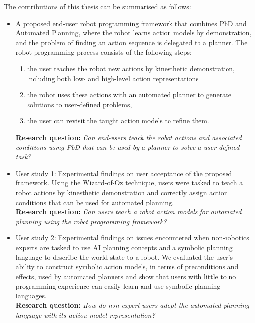 The contributions of this thesis can be summarised as follows:
\begin{itemize}
	\item {A proposed end-user robot programming framework that combines PbD and Automated Planning, where the robot learns action models by demonstration, and the problem of finding an action sequence is delegated to a planner. %
	The robot programming process consists of the following steps:
	\begin{enumerate}
		\item the user teaches the robot new actions by kinesthetic demonstration, including both low- and high-level action representations
		\item the robot uses these actions with an automated planner to generate solutions to user-defined problems,
		\item the user can revisit the taught action models to refine them.
	\end{enumerate}
	\textbf{Research question:} \textit{Can end-users teach the robot actions and associated conditions using PbD that can be used by a planner to solve a user-defined task?}}

    \item {User study 1: Experimental findings on user acceptance of the proposed framework. Using the Wizard-of-Oz technique, users were tasked to teach a robot actions by kinesthetic demonstration and correctly assign action conditions that can be used for automated planning.\\
    \textbf{Research question:} \textit{Can users teach a robot action models for automated planning using the robot programming framework?}}

    \item {User study 2: Experimental findings on issues encountered when non-robotics experts are tasked to use AI planning concepts and a symbolic planning language to describe the world state to a robot. 
    We evaluated the user's ability to construct symbolic action models, in terms of preconditions and effects, used by automated planners and show that users with little to no programming experience can easily learn and use symbolic planning languages.\\%
    \textbf{Research question:} \textit{How do non-expert users adopt the automated planning language with its action model representation?}}


\end{itemize}
